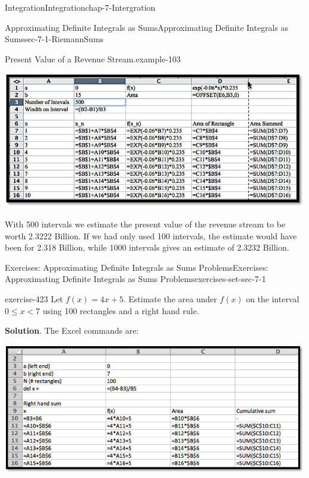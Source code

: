 \documentclass[oneside,10pt,]{book}
\numberwithin{equation}{section}
\newcommand{\lt}{<}
\begin{document}
\begin{chapterptx}{Integration}{}{Integration}{}{}{chap-7-Intergration}
\begin{sectionptx}{Approximating Definite Integrals as Sums}{}{Approximating Definite Integrals as Sums}{}{}{sec-7-1-RiemannSums}
\begin{example}{Present Value of a Revenue Stream.}{example-103}
\begin{sidebyside}{1}{0.1}{0.1}{0}%
\begin{sbspanel}{0.8}%
\includegraphics[width=1\linewidth]{images/sec7-1-12.png}
\end{sbspanel}%
\end{sidebyside}%
\par
\hypertarget{p-2570}{}%
With 500 intervals we estimate the present value of the revenue stream to be worth \textdollar{}2.3222 Billion.  If we had only used 100 intervals, the estimate would have been for \textdollar{}2.318 Billion, while 1000 intervals gives an estimate of \textdollar{}2.3232 Billion.%
\end{example}
%
%
\typeout{************************************************}
\typeout{************************************************}
%
\begin{exercises-subsection-numberless}{Exercises: Approximating Definite Integrals as Sums Problems}{}{Exercises: Approximating Definite Integrals as Sums Problems}{}{}{exercises-set-sec-7-1}
\begin{divisionexercise}{1}{}{}{exercise-423}%
\hypertarget{p-2571}{}%
Let \(f(x) = 4 x + 5\).  Estimate the area under \(f(x)\) on the interval \(0 \le  x \lt 7\) using 100 rectangles and a right hand rule.%
\par\smallskip%
\noindent\textbf{Solution}.\hypertarget{solution-214}{}\quad%
\hypertarget{p-2572}{}%
The Excel commands are:%
\begin{sidebyside}{1}{0}{0}{0}%
\begin{sbspanel}{1}%
\includegraphics[width=1\linewidth]{images/sec7-1-sol1a.png}

\end{sbspanel}
\end{sidebyside}
\end{divisionexercise}
\end{exercises-subsection-numberless}
\end{sectionptx}
\end{chapterptx}
\end{document}
